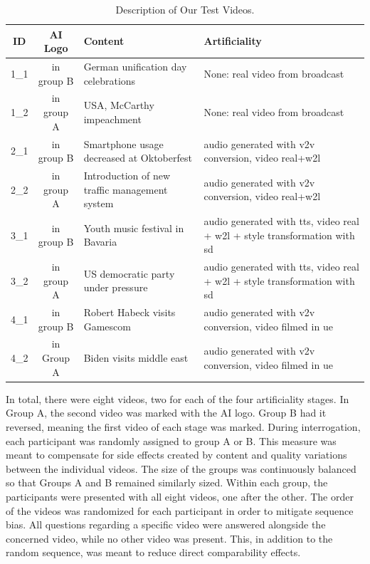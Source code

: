 \documentclass[
  a4paper,  %
  twoside,  %
  bibliography=totoc,
  headsepline,
  cleardoublepage=empty,
  parskip=half,
  draft=false
]{scrbook}
\begin{document}
\begin{table}[h]
  \centering
  \begin{tabularx}{\linewidth}{c|c|X|X}
    \textbf{ID} & \textbf{AI Logo} & \textbf{Content} & \textbf{Artificiality}\\
    \midrule
    1\_1 & in group B & German unification day celebrations  & None: real video from broadcast \\
    \midrule
    1\_2 & in group A & USA, McCarthy impeachment  & None: real video from broadcast \\
    \midrule
    2\_1 & in group B & Smartphone usage decreased at Oktoberfest  & audio generated with \gls{v2v} conversion, video real+\gls{w2l} \\
    \midrule
    2\_2 & in group A & Introduction of new traffic management system  & audio generated with \gls{v2v} conversion, video real+\gls{w2l} \\
    \midrule
    3\_1 & in group B & Youth music festival in Bavaria  & audio generated with \gls{tts}, video real + \gls{w2l} + style transformation with \gls{sd} \\
    \midrule
    3\_2 & in group A & US democratic party under pressure  & audio generated with \gls{tts}, video real + \gls{w2l} + style transformation with \gls{sd} \\
    \midrule
    4\_1 & in group B & Robert Habeck visits Gamescom  & audio generated with \gls{v2v} conversion, video filmed in \gls{ue} \\
    \midrule
    4\_2 & in Group A & Biden visits middle east  & audio generated with \gls{v2v} conversion, video filmed in \gls{ue} \\
  \end{tabularx}
  \caption{Description of Our Test Videos.}
  \label{tab:video-table}
\end{table}

In total, there were eight videos, two for each of the four artificiality stages. In Group A, the second video was marked with the AI logo. Group B had it reversed, meaning the first video of each stage was marked. During interrogation, each participant was randomly assigned to group A or B. This measure was meant to compensate for side effects created by content and quality variations between the individual videos. The size of the groups was continuously balanced so that Groups A and B remained similarly sized. Within each group, the participants were presented with all eight videos, one after the other. The order of the videos was randomized for each participant in order to mitigate sequence bias. All questions regarding a specific video were answered alongside the concerned video, while no other video was present. This, in addition to the random sequence, was meant to reduce direct comparability effects.
\end{document}
